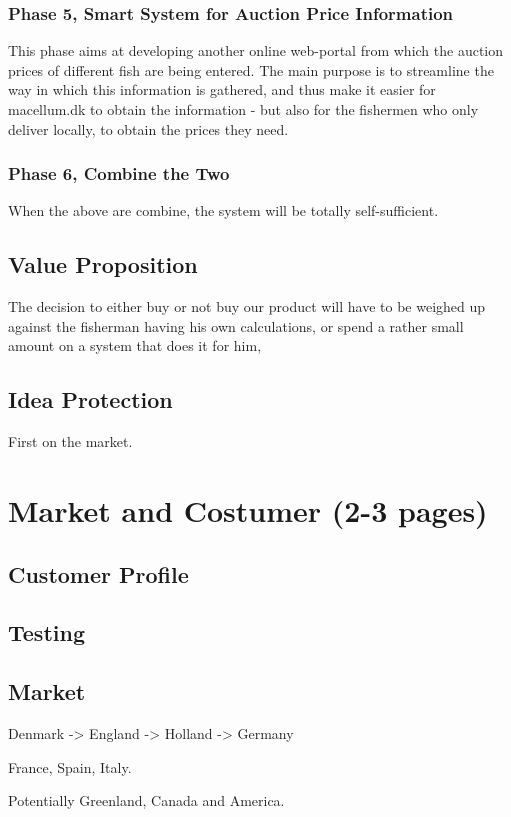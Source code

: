 \documentclass[a4paper,10pt,oneside,fleqn]{article}
\begin{document}
\subsubsection{Phase 5, Smart System for Auction Price Information}
This phase aims at developing another online web-portal from which the auction prices of different fish are being entered. The main purpose is to streamline the way in which this information is gathered, and thus make it easier for macellum.dk to obtain the information - but also for the fishermen who only deliver locally, to obtain the prices they need. 


\subsubsection{Phase 6, Combine the Two}
When the above are combine, the system will be totally self-sufficient. 

\subsection{Value Proposition}
The decision to either buy or not buy our product will have to be weighed up against the fisherman having his own calculations, or spend a rather small amount on a system that does it for him,

\subsection{Idea Protection}
First on the market. 

\section{Market and Costumer (2-3 pages)}
\subsection{Customer Profile}
\subsection{Testing}
\subsection{Market}
Denmark -> England -> Holland -> Germany

France, Spain, Italy.

Potentially Greenland, Canada and America.
\end{document}
